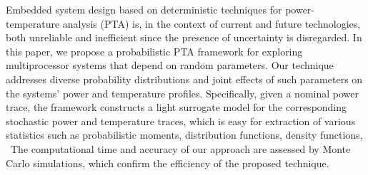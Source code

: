 Embedded system design based on deterministic techniques for power-temperature analysis (PTA) is, in the context of current and future technologies, both unreliable and inefficient since the presence of uncertainty is disregarded. In this paper, we propose a probabilistic PTA framework for exploring multiprocessor systems that depend on random parameters. Our technique addresses diverse probability distributions and joint effects of such parameters on the systems' power and temperature profiles. Specifically, given a nominal power trace, the framework constructs a light surrogate model for the corresponding stochastic power and temperature traces, which is easy for extraction of various statistics such as probabilistic moments, distribution functions, density functions, \etc\ The computational time and accuracy of our approach are assessed by Monte Carlo simulations, which confirm the efficiency of the proposed technique.
